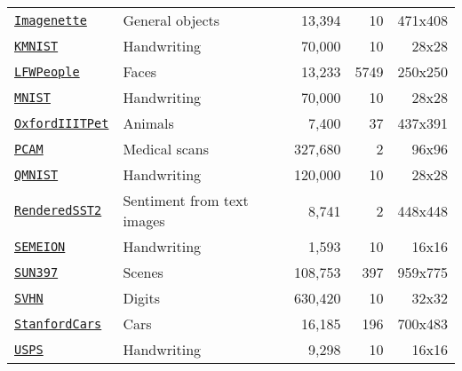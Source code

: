 \begin{table}[htbp]
\begin{tabular}{llrrr}
\href{https://github.com/fastai/imagenette#imagenette-1}{\texttt{Imagenette}} & General objects & 13,394 & 10 & 471x408 \\
\href{https://github.com/rois-codh/kmnist}{\texttt{KMNIST}} & Handwriting & 70,000 & 10 & 28x28 \\
\href{http://vis-www.cs.umass.edu/lfw/}{\texttt{LFWPeople}} & Faces & 13,233 & 5749 & 250x250 \\
\href{http://yann.lecun.com/exdb/mnist/}{\texttt{MNIST}} & Handwriting & 70,000 & 10 & 28x28 \\
\href{https://www.robots.ox.ac.uk/~vgg/data/pets/}{\texttt{OxfordIIITPet}} & Animals & 7,400 & 37 & 437x391 \\
\href{https://github.com/basveeling/pcam}{\texttt{PCAM}} & Medical scans & 327,680 & 2 & 96x96 \\
\href{https://github.com/facebookresearch/qmnist}{\texttt{QMNIST}} & Handwriting & 120,000 & 10 & 28x28 \\
\href{https://github.com/openai/CLIP/blob/main/data/rendered-sst2.md}{\texttt{RenderedSST2}} & Sentiment from text images & 8,741 & 2 & 448x448 \\
\href{https://archive.ics.uci.edu/dataset/178/semeion+handwritten+digit}{\texttt{SEMEION}} & Handwriting & 1,593 & 10 & 16x16 \\
\href{https://vision.princeton.edu/projects/2010/SUN/}{\texttt{SUN397}} & Scenes & 108,753 & 397 & 959x775 \\
\href{http://ufldl.stanford.edu/housenumbers/}{\texttt{SVHN}} & Digits & 630,420 & 10 & 32x32 \\
\href{https://www.kaggle.com/datasets/jessicali9530/stanford-cars-dataset}{\texttt{StanfordCars}} & Cars & 16,185 & 196 & 700x483 \\
\href{https://www.csie.ntu.edu.tw/~cjlin/libsvmtools/datasets/multiclass.html#usps}{\texttt{USPS}} & Handwriting & 9,298 & 10 & 16x16 \\
\bottomrule
\end{tabular}
\end{table}
